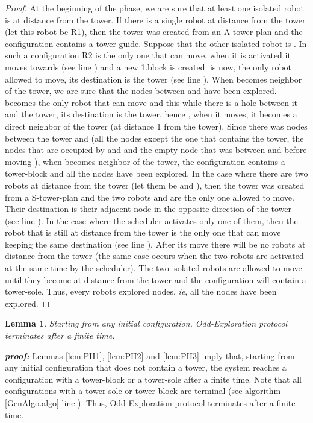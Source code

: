 \documentclass[12pt]{llncs}
\newtheorem{lem}{Lemma}
\begin{document}
\begin{proof}
At the beginning of the phase, we are sure that at least one isolated robot is at distance  from the tower. If there is a single robot at distance  from the tower (let this robot be R1), then the tower was created from an A-tower-plan and the configuration contains a tower-guide. Suppose that the other isolated robot is . In such a configuration R2 is the only one that can move, when it is activated it moves towards  (see line ) and a new 1.block is created.  is now, the only robot allowed to move, its destination is the tower (see line ). When  becomes neighbor of the tower, we are sure that the nodes between  and  have been explored.  becomes the only robot that can move and this while there is a hole between it and the tower, its destination is the tower, hence , when it moves, it becomes a direct neighbor of the tower (at distance 1 from the tower). Since there was  nodes between the tower and  (all the nodes except the one that contains the tower, the nodes that are occupied by  and  and the empty node that was between  and  before moving ), when  becomes neighbor of the tower, the configuration contains a tower-block and all the nodes have been explored.
In the case where there are two robots at distance  from the tower (let them be  and ), then the tower was created from a S-tower-plan and the two robots  and  are the only one allowed to move. Their destination is their adjacent node in the opposite direction of the tower (see line ). In the case where the scheduler activates only one of them, then the robot that is still at distance  from the tower is the only one that can move keeping the same destination (see line ). After its move there will be no robots at distance  from the tower (the same case occurs when the two robots are activated at the same time by the scheduler). The two isolated robots are allowed to move until they become at distance  from the tower and the configuration will contain a tower-sole. Thus, every robots explored  nodes, \textit{ie}, all the nodes have been explored. 
\end{proof} 


\begin {lem}
Starting from any initial configuration, Odd-Exploration protocol terminates after a finite time.
\end {lem}
\textit{\textbf{proof:}}
Lemmas \ref{lem:PH1}, \ref{lem:PH2}  and \ref{lem:PH3} imply that, starting from any initial configuration that does not contain a tower, the system reaches a configuration with a tower-block or a tower-sole after a finite time. Note that all configurations with a tower sole or tower-block  are terminal (see algorithm \ref{GenAlgo.algo} line ). Thus, Odd-Exploration protocol terminates after a finite time. 
\end{document}
